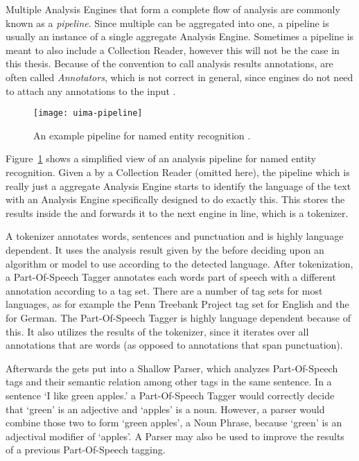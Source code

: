 Multiple Analysis Engines that form a complete flow of analysis are commonly known as a \emph{pipeline}. Since multiple \anens{} can be aggregated into one, a pipeline is usually an instance of a single aggregate Analysis Engine. Sometimes a pipeline is meant to also include a Collection Reader, however this will not be the case in this thesis. Because of the convention to call analysis results annotations, \anens{} are often called \emph{Annotators}, which is not correct in general, since engines do not need to attach any annotations to the input \cas{}.

\begin{figure}[hbt]
	\centering
	\texttt{[image: uima-pipeline]}
	\caption[An example UIMA pipeline for NER.]{An example \uima{} pipeline for named entity recognition \cite{uimasdk}.}
	\label{fig:uimaner}
\end{figure}

Figure~\ref{fig:uimaner} shows a simplified view of an analysis pipeline for named entity recognition. Given a \cas{} by a Collection Reader (omitted here), the pipeline which is really just a aggregate Analysis Engine starts to identify the language of the text with an Analysis Engine specifically designed to do exactly this. This \anen{} stores the results inside the \cas{} and forwards it to the next engine in line, which is a tokenizer. 

A tokenizer annotates words, sentences and punctuation and is highly language dependent. It uses the analysis result given by the \anen{} before deciding upon an algorithm or model to use according to the detected language. After tokenization, a Part-Of-Speech Tagger annotates each words part of speech with a different annotation according to a tag set. There are a number of tag sets for most languages, as for example the Penn Treebank Project tag set for English and the \stts{} for German. The Part-Of-Speech Tagger is highly language dependent because of this. It also utilizes the results of the tokenizer, since it iterates over all annotations that are words (as opposed to annotations that span punctuation).

Afterwards the \cas{} gets put into a Shallow Parser, which analyzes Part-Of-Speech tags and their semantic relation among other tags in the same sentence. In a sentence `I like green apples.' a Part-Of-Speech Tagger would correctly decide that `green' is an adjective and `apples' is a noun. However, a parser would combine those two to form `green apples', a Noun Phrase, because `green' is an adjectival modifier of `apples'. A Parser may also be used to improve the results of a previous Part-Of-Speech tagging.

